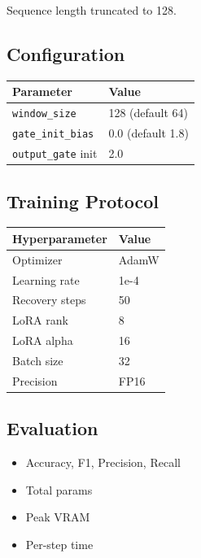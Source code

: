 Sequence length truncated to 128.

\subsection{Configuration}

\begin{table}[H]
\centering
\small
\begin{tabular}{ll}
\toprule
\textbf{Parameter} & \textbf{Value} \\
\midrule
\texttt{window\_size} & 128 (default 64) \\
\texttt{gate\_init\_bias} & 0.0 (default 1.8) \\
\texttt{output\_gate} init & 2.0 \\
\bottomrule
\end{tabular}
\end{table}

\subsection{Training Protocol}

\begin{table}[H]
\centering
\small
\begin{tabular}{ll}
\toprule
\textbf{Hyperparameter} & \textbf{Value} \\
\midrule
Optimizer & AdamW \\
Learning rate & 1e-4 \\
Recovery steps & 50 \\
LoRA rank & 8 \\
LoRA alpha & 16 \\
Batch size & 32 \\
Precision & FP16 \\
\bottomrule
\end{tabular}
\end{table}

\subsection{Evaluation}

\begin{itemize}
\item Accuracy, F1, Precision, Recall
\item Total params
\item Peak VRAM
\item Per-step time

\end{itemize}
